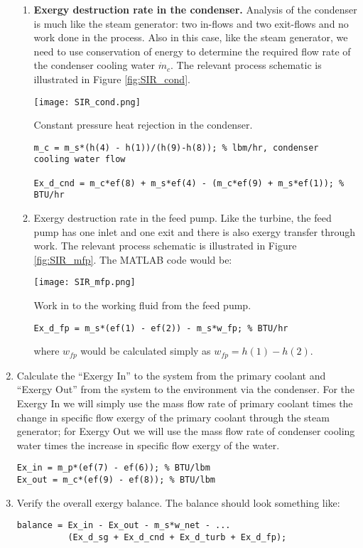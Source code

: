 \begin{enumerate}
\begin{enumerate}
\item \textbf{Exergy destruction rate in the condenser.}  Analysis of the condenser is much like the steam generator: two in-flows and two exit-flows and no work done in the process.  Also in this case, like the steam generator, we need to use conservation of energy to determine the required flow rate of the condenser cooling water $\dot{m}_c$.  The relevant process schematic is illustrated in Figure \ref{fig:SIR_cond}.

\begin{marginfigure}
\texttt{[image: SIR\_cond.png]}
\caption{Constant pressure heat rejection in the condenser.}
\label{fig:SIR_cond}
\end{marginfigure}

\begin{lstlisting}
m_c = m_s*(h(4) - h(1))/(h(9)-h(8)); % lbm/hr, condenser cooling water flow

Ex_d_cnd = m_c*ef(8) + m_s*ef(4) - (m_c*ef(9) + m_s*ef(1)); % BTU/hr
\end{lstlisting}

\item Exergy destruction rate in the feed pump.  Like the turbine, the feed pump has one inlet and one exit and there is also exergy transfer through work. The relevant process schematic is illustrated in Figure \ref{fig:SIR_mfp}. The MATLAB code would be:
\begin{marginfigure}
\texttt{[image: SIR\_mfp.png]}
\caption{Work in to the working fluid from the feed pump.}
\label{fig:SIR_mfp}
\end{marginfigure}
\begin{lstlisting}
Ex_d_fp = m_s*(ef(1) - ef(2)) - m_s*w_fp; % BTU/hr
\end{lstlisting}
where $w_{fp}$ would be calculated simply as $w_{fp} = h(1) - h(2)$.  

\end{enumerate}

\item Calculate the ``Exergy In'' to the system from the primary coolant and ``Exergy Out'' from the system to the environment via the condenser.  For the Exergy In we will simply use the mass flow rate of primary coolant times the change in specific flow exergy of the primary coolant through the steam generator; for Exergy Out we will use the mass flow rate of condenser cooling water times the increase in specific flow exergy of the water.

\begin{lstlisting}
Ex_in = m_p*(ef(7) - ef(6)); % BTU/lbm
Ex_out = m_c*(ef(9) - ef(8)); % BTU/lbm
\end{lstlisting}

\item Verify the overall exergy balance.  The balance should look something like:

\begin{lstlisting}
balance = Ex_in - Ex_out - m_s*w_net - ...
          (Ex_d_sg + Ex_d_cnd + Ex_d_turb + Ex_d_fp);
\end{lstlisting}

\end{enumerate}

